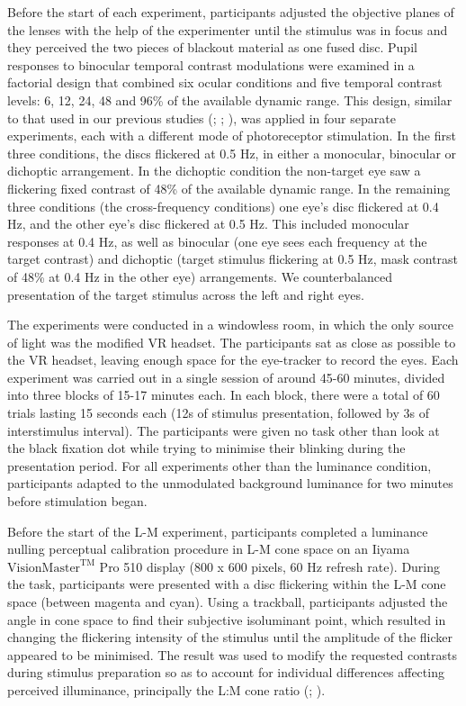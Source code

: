 \documentclass[
]{article}
\begin{document}
Before the start of each experiment, participants adjusted the objective planes of the lenses with the help of the experimenter until the stimulus was in focus and they perceived the two pieces of blackout material as one fused disc. Pupil responses to binocular temporal contrast modulations were examined in a factorial design that combined six ocular conditions and five temporal contrast levels: 6, 12, 24, 48 and 96\% of the available dynamic range. This design, similar to that used in our previous studies (; ; ), was applied in four separate experiments, each with a different mode of photoreceptor stimulation. In the first three conditions, the discs flickered at 0.5 Hz, in either a monocular, binocular or dichoptic arrangement. In the dichoptic condition the non-target eye saw a flickering fixed contrast of 48\% of the available dynamic range. In the remaining three conditions (the cross-frequency conditions) one eye's disc flickered at 0.4 Hz, and the other eye's disc flickered at 0.5 Hz. This included monocular responses at 0.4 Hz, as well as binocular (one eye sees each frequency at the target contrast) and dichoptic (target stimulus flickering at 0.5 Hz, mask contrast of 48\% at 0.4 Hz in the other eye) arrangements. We counterbalanced presentation of the target stimulus across the left and right eyes.

The experiments were conducted in a windowless room, in which the only source of light was the modified VR headset. The participants sat as close as possible to the VR headset, leaving enough space for the eye-tracker to record the eyes. Each experiment was carried out in a single session of around 45-60 minutes, divided into three blocks of 15-17 minutes each. In each block, there were a total of 60 trials lasting 15 seconds each (12s of stimulus presentation, followed by 3s of interstimulus interval). The participants were given no task other than look at the black fixation dot while trying to minimise their blinking during the presentation period. For all experiments other than the luminance condition, participants adapted to the unmodulated background luminance for two minutes before stimulation began.

Before the start of the L-M experiment, participants completed a luminance nulling perceptual calibration procedure in L-M cone space on an Iiyama \(\textrm{VisionMaster}^{\textrm{TM}}\) Pro 510 display (800 x 600 pixels, 60 Hz refresh rate). During the task, participants were presented with a disc flickering within the L-M cone space (between magenta and cyan). Using a trackball, participants adjusted the angle in cone space to find their subjective isoluminant point, which resulted in changing the flickering intensity of the stimulus until the amplitude of the flicker appeared to be minimised. The result was used to modify the requested contrasts during stimulus preparation so as to account for individual differences affecting perceived illuminance, principally the L:M cone ratio (; ).
\end{document}
